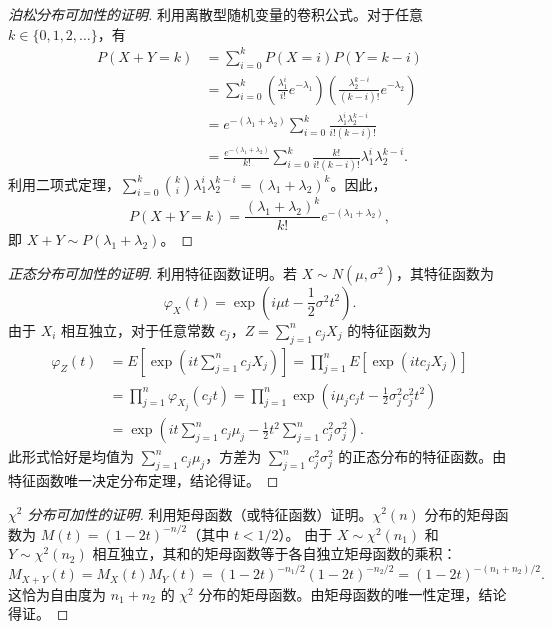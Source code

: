 ﻿\documentclass[lang=cn,11pt]{elegantbook}
\begin{document}
\begin{proof}[泊松分布可加性的证明]
利用离散型随机变量的卷积公式。对于任意 $k \in \{0, 1, 2, \dots\}$，有
\begin{align*}
    P(X+Y=k) &= \sum_{i=0}^{k} P(X=i)P(Y=k-i) \\
    &= \sum_{i=0}^{k} \left( \frac{\lambda_1^i}{i!} e^{-\lambda_1} \right) \left( \frac{\lambda_2^{k-i}}{(k-i)!} e^{-\lambda_2} \right) \\
    &= e^{-(\lambda_1+\lambda_2)} \sum_{i=0}^{k} \frac{\lambda_1^i \lambda_2^{k-i}}{i!(k-i)!} \\
    &= \frac{e^{-(\lambda_1+\lambda_2)}}{k!} \sum_{i=0}^{k} \frac{k!}{i!(k-i)!} \lambda_1^i \lambda_2^{k-i}.
\end{align*}
利用二项式定理，$\sum_{i=0}^{k} \binom{k}{i} \lambda_1^i \lambda_2^{k-i} = (\lambda_1 + \lambda_2)^k$。因此，
\[
    P(X+Y=k) = \frac{(\lambda_1+\lambda_2)^k}{k!} e^{-(\lambda_1+\lambda_2)},
\]
即 $X+Y \sim P(\lambda_1+\lambda_2)$。
\end{proof}

\begin{proof}[正态分布可加性的证明]
利用特征函数证明。若 $X \sim N(\mu, \sigma^2)$，其特征函数为
\[
\varphi_X(t) = \exp\left(i\mu t - \frac{1}{2}\sigma^2 t^2\right).
\]
由于 $X_i$ 相互独立，对于任意常数 $c_j$，$Z = \sum_{j=1}^{n}c_j X_j$ 的特征函数为
\begin{align*}
    \varphi_Z(t) &= E\left[\exp\left(it\sum_{j=1}^{n}c_j X_j\right)\right] = \prod_{j=1}^{n} E\left[\exp(it c_j X_j)\right] \\
    &= \prod_{j=1}^{n} \varphi_{X_j}(c_j t) = \prod_{j=1}^{n} \exp\left(i\mu_j c_j t - \frac{1}{2}\sigma_j^2 c_j^2 t^2\right) \\
    &= \exp\left(it\sum_{j=1}^{n}c_j\mu_j - \frac{1}{2}t^2\sum_{j=1}^{n}c_j^2\sigma_j^2\right).
\end{align*}
此形式恰好是均值为 $\sum_{j=1}^{n}c_j\mu_j$，方差为 $\sum_{j=1}^{n}c_j^2\sigma_j^2$ 的正态分布的特征函数。由特征函数唯一决定分布定理，结论得证。
\end{proof}

\begin{proof}[$\chi^2$ 分布可加性的证明]
利用矩母函数（或特征函数）证明。$\chi^2(n)$ 分布的矩母函数为 $M(t) = (1-2t)^{-n/2}$（其中 $t < 1/2$）。
由于 $X \sim \chi^2(n_1)$ 和 $Y \sim \chi^2(n_2)$ 相互独立，其和的矩母函数等于各自独立矩母函数的乘积：
\[
    M_{X+Y}(t) = M_X(t) M_Y(t) = (1-2t)^{-n_1/2} (1-2t)^{-n_2/2} = (1-2t)^{-(n_1+n_2)/2}.
\]
这恰为自由度为 $n_1+n_2$ 的 $\chi^2$ 分布的矩母函数。由矩母函数的唯一性定理，结论得证。
\end{proof}
\end{document}
